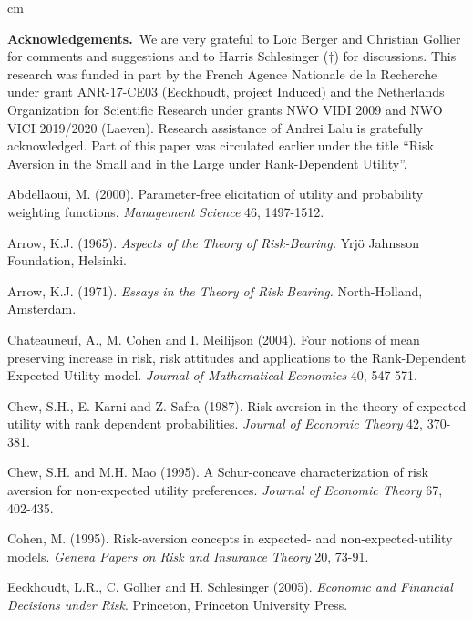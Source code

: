 \documentclass[11pt]{article}
\begin{document}
\newpage

 cm

\textbf{Acknowledgements.}\
We are very grateful
to
Lo\"ic Berger 
and 
Christian Gollier for 
comments
and suggestions and to Harris Schlesinger ($\dag$) for discussions.
This research was funded in part by
the French Agence Nationale de la Recherche under grant ANR-17-CE03 (Eeckhoudt, project Induced)
and the Netherlands Organization for Scientific Research under grants NWO VIDI 2009 and NWO VICI 2019/2020 (Laeven).
Research assistance of Andrei Lalu is gratefully acknowledged.
Part of this paper was circulated earlier under the title
``Risk Aversion in the Small and in the Large under Rank-Dependent Utility''.


\begin{spacing}{0.0}

\begin{thebibliography}{99}
{\sc Abdellaoui, M.} (2000).
Parameter-free elicitation of utility and probability weighting functions.
{\it Management Science} 46, 1497-1512.

{\sc Arrow, K.J.} (1965).
{\it Aspects of the Theory of Risk-Bearing.}
Yrj\"o Jahnsson Foundation, Helsinki.

{\sc Arrow, K.J.} (1971).
{\it Essays in the Theory of Risk Bearing.}
North-Holland, Amsterdam.

{\sc Chateauneuf, A., M. Cohen and I. Meilijson} (2004).
Four notions of mean preserving increase in risk, risk attitudes
and applications to the Rank-Dependent Expected Utility model.
{\it Journal of Mathematical Economics} 40, 547-571.

{\sc Chew, S.H., E. Karni and Z. Safra} (1987).
Risk aversion in the theory of expected utility with rank dependent probabilities.
{\it Journal of Economic Theory} 42, 370-381.

{\sc Chew, S.H. and M.H. Mao} (1995).
A Schur-concave characterization of risk aversion for non-expected utility preferences.
{\it Journal of Economic Theory} 67, 402-435.

{\sc Cohen, M.} (1995).
Risk-aversion concepts in expected- and non-expected-utility models.
{\it Geneva Papers on Risk and Insurance Theory} 20, 73-91.

{\sc Eeckhoudt, L.R., C. Gollier and H. Schlesinger} (2005).
{\it Economic and Financial Decisions under Risk}.
Princeton, Princeton University Press.


\end{thebibliography}
\end{spacing}
\end{document}
